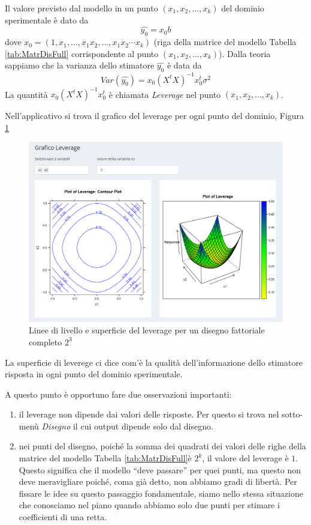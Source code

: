\documentclass[
  11pt,
]{book}
\begin{document}
Il valore previsto dal modello in un punto \((x_1,x_2,\dots,x_k)\) del
dominio sperimentale è dato da
\[
\hat{y_0}=x_0b
\]
dove \(x_0=(1,x_1,\dots,x_1x_2,\dots,x_1x_2\cdots x_k)\) (riga della
matrice del modello Tabella \ref{tab:MatrDisFull} corrispondente al punto
\((x_1,x_2,\dots,x_k)\)). Dalla teoria sappiamo che la varianza dello
stimatore \(\hat{y_0}\) è data da
\[
Var(\hat{y_0})=x_0(X^tX)^{-1}x_0^t\sigma^2
\]
La quantità \(x_0(X^tX)^{-1}x_0^t\) è chiamata \emph{Leverage} nel punto
\((x_1,x_2,\dots,x_k)\).

Nell'applicativo si trova il grafico del leverage per ogni punto del
dominio, Figura \ref{fig:fc4}

\begin{figure}

{\centering \includegraphics[width=1\linewidth]{Immagini/Fatt_compl/04_lev} 

}

\caption{Linee di livello e superficie del leverage per un disegno fattoriale completo $2^3$}\label{fig:fc4}
\end{figure}

La superficie di leverege ci dice com'è la qualità dell'informazione
dello stimatore risposta in ogni punto del dominio sperimentale.

A questo punto è opportuno fare due osservazioni importanti:

\begin{enumerate}
\def\labelenumi{\arabic{enumi})}
\item
  il leverage non dipende dai valori delle risposte. Per questo si
  trova nel sotto-menù \emph{Disegno} il cui output dipende solo dal
  disegno.
\item
  nei punti del disegno, poiché la somma dei quadrati dei valori delle
  righe della matrice del modello Tabella \ref{tab:MatrDisFull}è \(2^k\), il
  valore del leverage è \(1\).\\
  Questo significa che il modello ``deve passare'' per quei punti, ma
  questo non deve meravigliare poiché, coma già detto, non abbiamo
  gradi di libertà. Per fissare le idee su questo passaggio
  fondamentale, siamo nello stessa situazione che conosciamo nel piano
  quando abbiamo solo due punti per stimare i coefficienti di una
  retta.
\end{enumerate}
\end{document}
